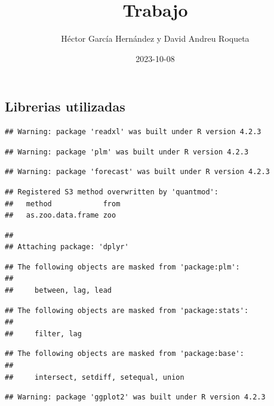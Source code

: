 \documentclass[
]{article}
\title{Trabajo}
\author{Héctor García Hernández y David Andreu Roqueta}
\date{2023-10-08}
\begin{document}
\maketitle

\hypertarget{librerias-utilizadas}{%
\subsection{Librerias utilizadas}\label{librerias-utilizadas}}

\begin{verbatim}
## Warning: package 'readxl' was built under R version 4.2.3
\end{verbatim}

\begin{verbatim}
## Warning: package 'plm' was built under R version 4.2.3
\end{verbatim}

\begin{verbatim}
## Warning: package 'forecast' was built under R version 4.2.3
\end{verbatim}

\begin{verbatim}
## Registered S3 method overwritten by 'quantmod':
##   method            from
##   as.zoo.data.frame zoo
\end{verbatim}

\begin{verbatim}
## 
## Attaching package: 'dplyr'
\end{verbatim}

\begin{verbatim}
## The following objects are masked from 'package:plm':
## 
##     between, lag, lead
\end{verbatim}

\begin{verbatim}
## The following objects are masked from 'package:stats':
## 
##     filter, lag
\end{verbatim}

\begin{verbatim}
## The following objects are masked from 'package:base':
## 
##     intersect, setdiff, setequal, union
\end{verbatim}

\begin{verbatim}
## Warning: package 'ggplot2' was built under R version 4.2.3
\end{verbatim}
\end{document}

